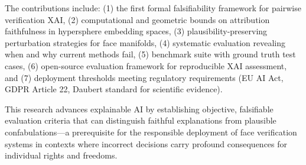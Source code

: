 \documentclass[a4paper, 11pt, oneside]{ThesisProposal}
\begin{document}
{The contributions include: (1) the first formal falsifiability framework for pairwise verification XAI, (2) computational and geometric bounds on attribution faithfulness in hypersphere embedding spaces, (3) plausibility-preserving perturbation strategies for face manifolds, (4) systematic evaluation revealing when and why current methods fail, (5) benchmark suite with ground truth test cases, (6) open-source evaluation framework for reproducible XAI assessment, and (7) deployment thresholds meeting regulatory requirements (EU AI Act, GDPR Article 22, Daubert standard for scientific evidence).

This research advances explainable AI by establishing objective, falsifiable evaluation criteria that can distinguish faithful explanations from plausible confabulations---a prerequisite for the responsible deployment of face verification systems in contexts where incorrect decisions carry profound consequences for individual rights and freedoms.

}

\clearpage

\pagestyle{fancy}

\tableofcontents

\listoffigures

\listoftables

\mainmatter	  %
\pagestyle{fancy}
\lhead{\fancyplain{}{\rightmark}}









\end{document}
